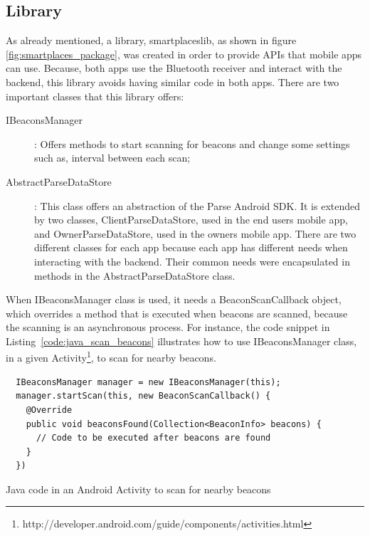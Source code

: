 \subsection{Library}
\label{sub:implementation_library}
As already mentioned, a library, smartplaceslib, as shown in figure \ref{fig:smartplaces_package}, was created in order to provide \glspl{API} that mobile apps can
use. Because, both apps use the Bluetooth receiver and interact with the backend, this library avoids having similar code in both apps. There are two important classes that this library offers:
\begin{description}
  \item[IBeaconsManager]: Offers methods to start scanning for beacons and change some settings such as, interval between each scan;
  \item[AbstractParseDataStore]: This class offers an abstraction of the Parse Android \gls{SDK}. It is extended by two classes, ClientParseDataStore, used in the end users mobile app, and OwnerParseDataStore, used in the owners mobile app. There are two different classes for each app because each app has different needs when interacting with the backend. Their common needs were encapsulated in methods in the AbstractParseDataStore class.
\end{description}

When IBeaconsManager class is used, it needs a BeaconScanCallback object, which overrides a method that is executed when beacons are scanned, because the scanning is an asynchronous process.
For instance, the code snippet in Listing~\ref{code:java_scan_beacons} illustrates how to use IBeaconsManager class, in a given
Activity\footnote{http://developer.android.com/guide/components/activities.html}, to scan for nearby beacons.

\begin{listing}[H]
  \begin{verbatim}
  IBeaconsManager manager = new IBeaconsManager(this);
  manager.startScan(this, new BeaconScanCallback() {
    @Override
    public void beaconsFound(Collection<BeaconInfo> beacons) {
      // Code to be executed after beacons are found
    }
  })
  \end{verbatim}
  \caption[Java code for beacon scanning]{Java code in an Android Activity to scan for nearby beacons}
  \label{code:java_scan_beacons}
\end{listing}

